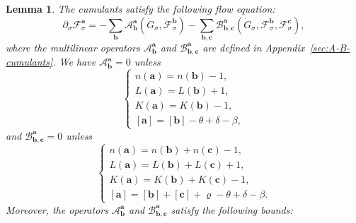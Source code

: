 \documentclass{article}
\numberwithin{equation}{section}
\theoremstyle{plain}
\newtheorem{lemma}[theorem]{Lemma}
\theoremstyle{definition}
\begin{document}
\begin{lemma}
  \label{lem:flow-cumulants}The cumulants satisfy the following flow equation:
  \begin{equation}
    \partial_{\sigma} \mathcal{F}^{\boldsymbol{a}}_{\sigma} =
    -\sum_{\boldsymbol{b}} \mathcal{A}^{\boldsymbol{a}}_{\boldsymbol{b}}
    (\dot{G}_{\sigma}, \mathcal{F}^{\boldsymbol{b}}_{\sigma}) -
    \sum_{\boldsymbol{b}, \boldsymbol{c}}
    \mathcal{B}^{\boldsymbol{a}}_{\boldsymbol{b}, \boldsymbol{c}} (\dot{G}_{\sigma},
    \mathcal{F}^{\boldsymbol{b}}_{\sigma}, \mathcal{F}^{\boldsymbol{c}}_{\sigma}),
    \label{eq:cumulant-flow}
  \end{equation}
  where the multilinear operators $\mathcal{A}^{\boldsymbol{a}}_{\boldsymbol{b}}$
  and $\mathcal{B}^{\boldsymbol{a}}_{\boldsymbol{b}, \boldsymbol{c}}$ are defined in
  Appendix~\ref{sec:A-B-cumulants}. We have
  $\mathcal{A}^{\boldsymbol{a}}_{\boldsymbol{b}} = 0$ unless
  \begin{equation}
    \left\{\begin{aligned}
      n (\boldsymbol{a}) = n (\boldsymbol{b}) - 1, \, \,\\
      L (\boldsymbol{a}) = L (\boldsymbol{b}) + 1,\\
      K (\boldsymbol{a}) = K (\boldsymbol{b}) - 1,\\
      {}[\boldsymbol{a}] = [\boldsymbol{b}] - \theta + \delta - \beta,
    \end{aligned}\right. \label{eq:characterization-a}
  \end{equation}
  and $\mathcal{B}^{\boldsymbol{a}}_{\boldsymbol{b}, \boldsymbol{c}}
  = 0$ unless
  \begin{equation}
    \left\{\begin{aligned}
      n (\boldsymbol{a}) = n (\boldsymbol{b}) + n (\boldsymbol{c}) - 1, \, \,\\
      L (\boldsymbol{a}) = L (\boldsymbol{b}) + L (\boldsymbol{c}) + 1,\\
      K (\boldsymbol{a}) = K (\boldsymbol{b}) + K (\boldsymbol{c}) - 1,\\
      {}[\boldsymbol{a}] = [\boldsymbol{b}] + [\boldsymbol{c}] + \varrho - \theta +
      \delta - \beta .
    \end{aligned}\right. \label{eq:characterization-b}
  \end{equation}
  Moreover, the operators $\mathcal{A}^{\boldsymbol{a}}_{\boldsymbol{b}}$ and
  $\mathcal{B}^{\boldsymbol{a}}_{\boldsymbol{b}, \boldsymbol{c}}$ satisfy the
  following bounds:
  \[ \begin{aligned}

\end{aligned}\]
\end{lemma}
\end{document}
